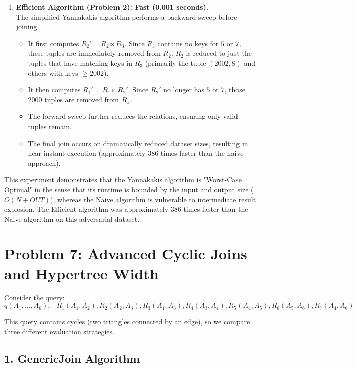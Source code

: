 \documentclass[11pt]{article}
\begin{document}
\begin{enumerate}
    \item \textbf{Efficient Algorithm (Problem 2): Fast (0.001 seconds).} \\
    The simplified Yannakakis algorithm performs a backward sweep before joining.
    \begin{itemize}
        \item It first computes $R_2' = R_2 \ltimes R_3$. Since $R_3$ contains no keys for $5$ or $7$, these tuples are immediately removed from $R_2$. $R_2$ is reduced to just the tuples that have matching keys in $R_3$ (primarily the tuple $(2002, 8)$ and others with keys $\ge 2002$).
        \item It then computes $R_1' = R_1 \ltimes R_2'$. Since $R_2'$ no longer has $5$ or $7$, those 2000 tuples are removed from $R_1$.
        \item The forward sweep further reduces the relations, ensuring only valid tuples remain.
        \item The final join occurs on dramatically reduced dataset sizes, resulting in near-instant execution (approximately 386 times faster than the naive approach).
    \end{itemize}
\end{enumerate}

This experiment demonstrates that the Yannakakis algorithm is "Worst-Case Optimal" in the sense that its runtime is bounded by the input and output size ($O(N+OUT)$), whereas the Naive algorithm is vulnerable to intermediate result explosion. The Efficient algorithm was approximately 386 times faster than the Naive algorithm on this adversarial dataset.

\section*{Problem 7: Advanced Cyclic Joins and Hypertree Width}

Consider the query:
\[ q(A_1, \dots, A_6) :- R_1(A_1, A_2), R_2(A_2, A_3), R_3(A_1, A_3), R_4(A_3, A_4), R_5(A_4, A_5), R_6(A_5, A_6), R_7(A_4, A_6) \]

This query contains cycles (two triangles connected by an edge), so we compare three different evaluation strategies.

\subsection*{1. GenericJoin Algorithm}
\end{document}
